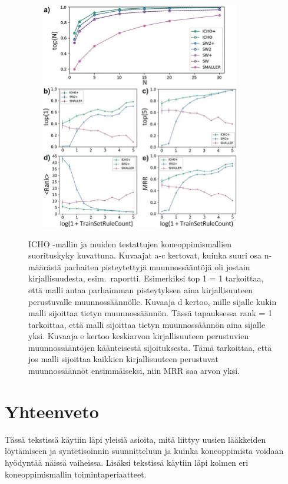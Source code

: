 \documentclass[finnish,twoside,censored,tkt,sw-line]{HYthesisML}
\begin{document}
\begin{figure}[!ht]
    \centering
    \includegraphics[width=10cm, height=10cm]{icho-performance-fig.jpg}
    \caption{
        ICHO -mallin ja muiden testattujen koneoppimismallien suorituskyky kuvattuna.
        Kuvaajat a-c kertovat, kuinka suuri osa n-määrästä parhaiten pisteytettyjä muunnossääntöjä oli jostain kirjallisuudesta, esim.\ raportti.
        Esimerkiksi top 1 = 1 tarkoittaa, että malli antaa parhaimman pisteytyksen aina kirjallisuuteen perustuvalle muunnossäännölle.
        Kuvaaja d kertoo, mille sijalle kukin malli sijoittaa tietyn muunnossäännön.
        Tässä tapauksessa rank = 1 tarkoittaa, että malli sijoittaa tietyn muunnossäännön aina sijalle yksi.
        Kuvaaja e kertoo keskiarvon kirjallisuuteen perustuvien muunnossääntöjen käänteisestä sijoituksesta.
        Tämä tarkoittaa, että jos malli sijoittaa kaikkien kirjallisuuteen perustuvat muunnossäännöt ensimmäiseksi, niin MRR saa arvon yksi.
    }
    {\cite{ExpertKnowledgeRetorsynthesis}}
    {\label{fig:icho-performance}}
\end{figure}

\chapter{Yhteenveto}

Tässä tekstissä käytiin läpi yleisiä asioita, mitä liittyy uusien lääkkeiden löytämiseen ja syntetisoinnin suunnitteluun ja kuinka koneoppimista voidaan hyödyntää näissä vaiheissa.
Lisäksi tekstissä käytiin läpi kolmen eri koneoppimismallin toimintaperiaatteet.
\end{document}

